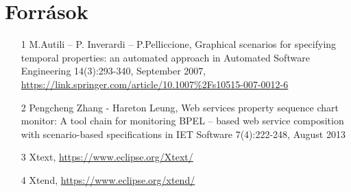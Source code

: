 \chapter{Források}
\begin{itemize}
    \item [1] M.Autili – P. Inverardi – P.Pelliccione, Graphical scenarios for specifying temporal properties: an automated approach in Automated Software Engineering 14(3):293-340, September
2007, \url{https://link.springer.com/article/10.1007%2Fs10515-007-0012-6}
    \item [2] Pengcheng Zhang - Hareton Leung, Web services property sequence chart monitor: A tool chain for monitoring BPEL – based web service composition with scenario-based specifications in IET Software 7(4):222-248, August
2013
    \item [3] Xtext, \url{https://www.eclipse.org/Xtext/}
    \item [4] Xtend, \url{https://www.eclipse.org/xtend/}
\end{itemize}